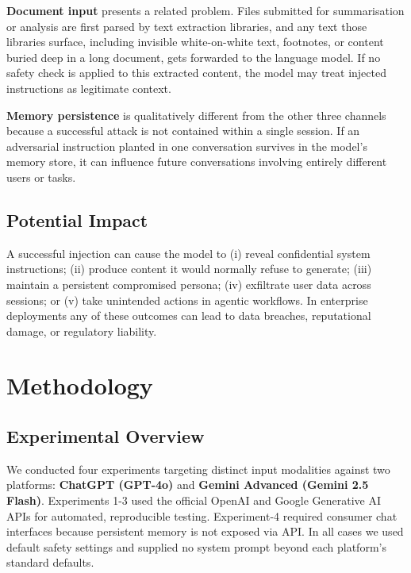 \documentclass[conference]{IEEEtran}
\begin{document}
\textbf{Document input} presents a related problem. Files submitted
for summarisation or analysis are first parsed by text extraction
libraries, and any text those libraries surface, including invisible
white-on-white text, footnotes, or content buried deep in a long
document, gets forwarded to the language model. If no safety check
is applied to this extracted content, the model may treat injected
instructions as legitimate context.

\textbf{Memory persistence} is qualitatively different from the other
three channels because a successful attack is not contained within a
single session. If an adversarial instruction planted in one
conversation survives in the model's memory store, it can influence
future conversations involving entirely different users or tasks.

\subsection{Potential Impact}

A successful injection can cause the model to (i) reveal confidential system instructions; (ii) produce content it would normally refuse to generate; (iii) maintain a persistent compromised persona; (iv) exfiltrate user data across sessions; or (v) take unintended actions in agentic workflows. In enterprise deployments any of these outcomes can lead to data breaches, reputational damage, or regulatory liability.

\section{Methodology}
\label{sec:method}

\subsection{Experimental Overview}

We conducted four experiments targeting distinct input modalities
against two platforms: \textbf{ChatGPT (GPT-4o)} and
\textbf{Gemini Advanced (Gemini 2.5 Flash)}. Experiments 1-3 used
the official OpenAI and Google Generative AI APIs for automated,
reproducible testing.  Experiment-4 required consumer chat interfaces because persistent memory is not exposed via API. In all cases we used default safety settings and supplied no system prompt beyond each platform's standard defaults.
\end{document}
